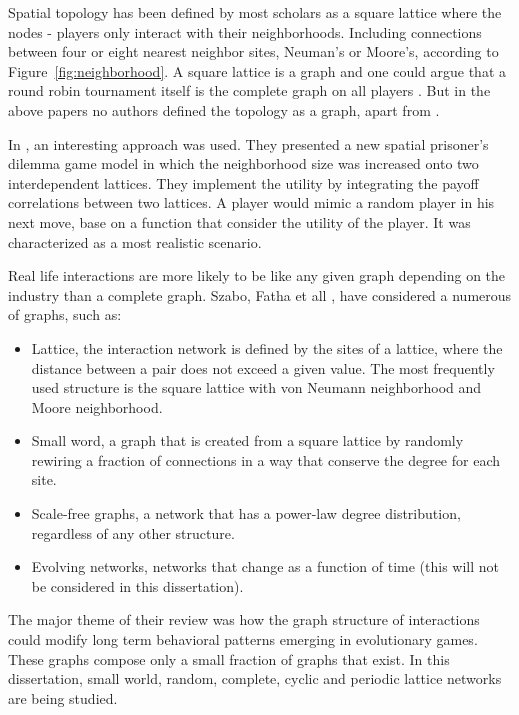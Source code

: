 Spatial topology has been defined by most scholars as a square lattice where
the nodes - players only interact with their neighborhoods. Including connections
between four or eight nearest neighbor sites, Neuman's or Moore's, according to
Figure~\ref{fig:neighborhood}. A square lattice is a graph and one could argue
that a round robin tournament itself is the complete graph on all players
\cite{Bela}. But in the above papers
no authors defined the topology as a graph, apart from \cite{Meng2015}.

In \cite{Meng2015}, an interesting approach was used. They presented a new
spatial prisoner's dilemma game model in which the neighborhood size was
increased onto two interdependent lattices. They implement the utility by
integrating the payoff correlations between two lattices. A player would mimic a
random player in his next move, base on a function that consider the utility of
the player. It was characterized as a most realistic scenario.

Real life interactions are more likely to be like any given graph depending on
the industry than a complete graph. Szabo, Fatha et all \cite{Szabo2007}, have
considered a numerous of graphs, such as:

\begin{itemize}
  \item Lattice, the interaction network is defined by the sites of a lattice,
   where the distance between a pair does not exceed a given value.
   The most frequently used structure is the square lattice with von Neumann
   neighborhood and Moore neighborhood.
  \item Small word, a graph that is created from a square lattice by randomly
   rewiring a fraction of connections in a way that conserve the degree for
   each site.
  \item Scale-free graphs, a network that has a power-law degree distribution, regardless of
   any other structure.
  \item Evolving networks, networks that change as a function of time (this will
      not be considered in this dissertation).
\end{itemize}

The major theme of their review was how the graph structure of interactions could
modify long term behavioral patterns emerging in evolutionary games.
These graphs compose only a small fraction of graphs that exist. In this
dissertation, small world, random, complete, cyclic and periodic lattice networks
are being studied.


